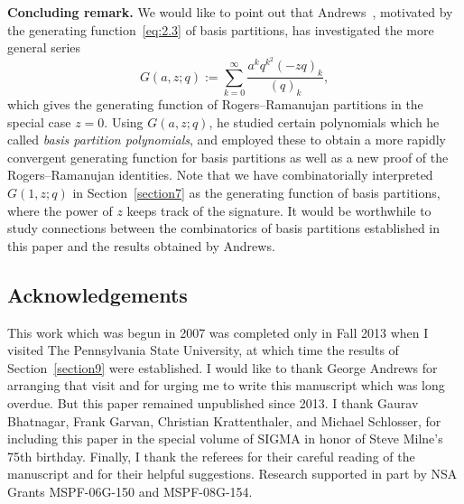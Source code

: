 \documentclass[pdftex]{sigma}
\numberwithin{equation}{section}
\theoremstyle{definition}
\begin{document}
{\bf Concluding remark.} We would like to point out that
Andrews~\cite{An2015}, motivated by the generating function~\eqref{eq:2.3}
of basis partitions, has investigated the more general series
\begin{equation*}
G(a,z;q):=\sum^{\infty}_{k=0}\frac{a^kq^{k^2}(-zq)_k}{(q)_k},%
\end{equation*}
which gives the generating function of Rogers--Ramanujan partitions in
the special case $z=0$. Using $G(a,z;q)$, he studied certain polynomials
which he called {\it basis partition polynomials}, and employed these
to obtain a more rapidly convergent generating function for basis partitions
as well as a new proof of the Rogers--Ramanujan identities. Note that we
have combinatorially interpreted $G(1,z;q)$ in Section~\ref{section7} as the generating
function of basis partitions, where the power of $z$ keeps track of the
signature. It would be worthwhile to study connections between the
combinatorics of basis partitions established in this paper and the results
obtained by Andrews.


\subsection*{Acknowledgements} This work which was begun in 2007 was completed
only in Fall 2013 when I visited The Pennsylvania State University, at
which time the results of Section~\ref{section9} were established. I would like to thank
George Andrews for arranging that visit and for urging me to write this
manuscript which was long overdue. But this paper remained unpublished
since 2013. I thank Gaurav Bhatnagar, Frank Garvan, Christian Krattenthaler,
and Michael Schlosser, for including this paper in the special volume
of SIGMA in honor of Steve Milne's 75th birthday.
Finally, I thank the referees for their careful reading of the manuscript
and for their helpful suggestions. Research supported in part by NSA Grants MSPF-06G-150 and
MSPF-08G-154.
\end{document}

